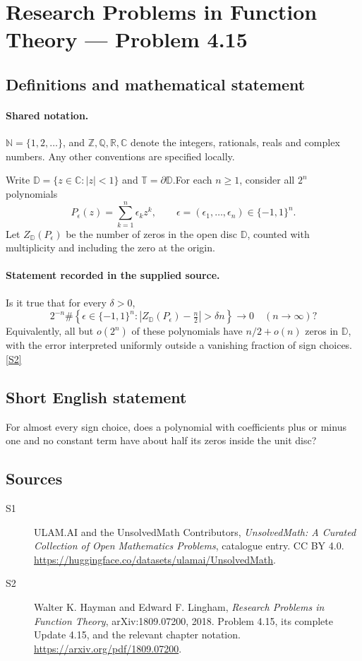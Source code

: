 \documentclass[11pt]{book}
\newcommand{\sref}[2]{\hyperlink{source:#1:#2}{[S#2]}}
\begin{document}
\section{Research Problems in Function Theory — Problem 4.15}\label{statement}

\subsection{Definitions and mathematical statement}

\paragraph{Shared notation.}$\mathbb N=\{1,2,\ldots\}$, and $\mathbb Z,\mathbb Q,\mathbb R,\mathbb C$ denote the integers, rationals, reals and complex numbers. Any other conventions are specified locally.


Write $\mathbb D=\{z\in\mathbb C:|z|<1\}$ and $\mathbb T=\partial\mathbb D$.For each $n\ge1$, consider all $2^n$ polynomials
\[P_\epsilon(z)=\sum_{k=1}^n\epsilon_kz^k,\qquad\epsilon=(\epsilon_1,\ldots,\epsilon_n)\in\{-1,1\}^n.
\]
Let $Z_{\mathbb D}(P_\epsilon)$ be the number of zeros in the open disc $\mathbb D$, counted with multiplicity and including the zero at the origin.
\paragraph{Statement recorded in the supplied source.}
Is it true that for every $\delta>0$,
\[2^{-n}\#\left\{\epsilon\in\{-1,1\}^n:\left|Z_{\mathbb D}(P_\epsilon)-\tfrac n2\right|>\delta n\right\}\longrightarrow0\quad(n\to\infty)?\]
Equivalently, all but $o(2^n)$ of these polynomials have $n/2+o(n)$ zeros in $\mathbb D$, with the error interpreted uniformly outside a vanishing fraction of sign choices. \sref{statement}{2}
\subsection{Short English statement}
For almost every sign choice, does a polynomial with coefficients plus or minus one and no constant term have about half its zeros inside the unit disc?
\subsection{Sources}
\begin{description}
\item[\hypertarget{source:statement:1}{S1}] ULAM.AI and the UnsolvedMath Contributors, \emph{UnsolvedMath: A Curated Collection of Open Mathematics Problems}, catalogue entry. CC BY 4.0. \url{https://huggingface.co/datasets/ulamai/UnsolvedMath}.
\item[\hypertarget{source:statement:2}{S2}] Walter K. Hayman and Edward F. Lingham, \emph{Research Problems in Function Theory}, arXiv:1809.07200, 2018. Problem 4.15, its complete Update 4.15, and the relevant chapter notation. \url{https://arxiv.org/pdf/1809.07200}.
\end{description}
\label{end:statement}
\end{document}
